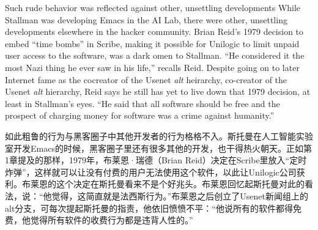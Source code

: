 \ifdefined\eng
\ifdefined\vone Such rude behavior was reflected against other, unsettling developments \fi\ifdefined\vtwo While Stallman was developing Emacs in the AI Lab, there were other, unsettling developments elsewhere \fi in the hacker community. Brian Reid's 1979 decision to embed ``time bombs'' in Scribe, making it possible for Unilogic to limit unpaid user access to the software, was a dark omen to Stallman. ``He considered it the most Nazi thing he ever saw in his life,'' recalls Reid. Despite going on to later Internet fame as the \ifdefined\vone cocreator of the Usenet \textit{alt} heirarchy, \fi\ifdefined\vtwo co-creator of the Usenet \textit{alt} hierarchy, \fi Reid says he still has yet to live down that 1979 decision, at least in Stallman's eyes. ``He said that all software should be free and the prospect of charging money for software was a crime against humanity.''
\fi

\ifdefined\chs
\ifdefined\vone 如此粗鲁的行为与黑客圈子中其他开发者的行为格格不入。\fi\ifdefined\vtwo 斯托曼在人工智能实验室开发Emacs的时候，黑客圈子里还有很多其他的开发，也干得热火朝天。\fi 正如第1章提及的那样，1979年，布莱恩·瑞德（Brian Reid）决定在Scribe里放入``定时炸弹''，这样就可以让没有付费的用户无法使用这个软件，以此让Unilogic公司获利。布莱恩的这个决定在斯托曼看来不是个好兆头。布莱恩回忆起斯托曼对此的看法，说：``他觉得，这简直就是法西斯行为。''布莱恩之后创立了Usenet新闻组上的alt分支，可每次提起斯托曼的指责，他依旧愤愤不平：``他说所有的软件都得免费，他觉得所有软件的收费行为都是违背人性的。''
\fi

